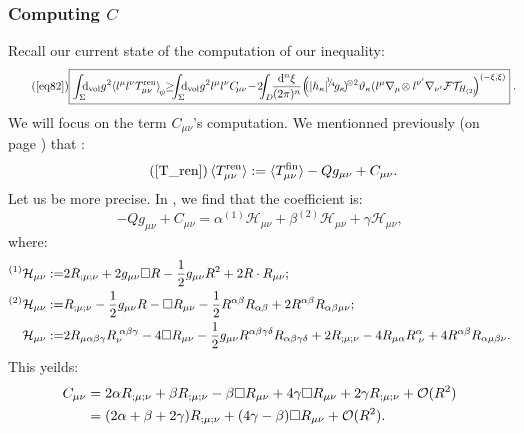\documentclass[a4paper,11pt]{article}
\numberwithin{equation}{section}
\theoremstyle{definition}
\renewcommand{\d}{{\mathrm{d}}}
\begin{document}
\subsubsection{Computing $C$}
Recall our current state of the computation of our inequality:
\begin{equation}\tag{\ref{eq82}}
    \boxed{\int_\Sigma \!\!\!\d_\mathrm{vol} g^2 \!\braket{l^\mu l^\nu T^\mathrm{ren}_{\mu\nu}}_{\!\psi} \!\!\geq\!\!\! \int_\Sigma \!\!\!\d_\mathrm{vol} g^2l^\mu l^\nu C_{\!\mu\nu}\!-\!2\!\!\!\int_D\!\!\frac{\d^n\xi}{(2\pi)^n}\!\left(\!\!(|h_\kappa|^{\!^1\!\!/_{\!4}}\!g_\kappa\!)^{\!\otimes 2}\vartheta_\kappa(l^\mu\nabla_\mu\!\otimes l^{\nu'}\nabla_{\nu'}\mathcal{FT}_{\!\!H_{(2)}}\!\!\right)^{(-\xi,\xi)}}\;.\!\!\!
\end{equation}
We will focus on the term $C_{\mu\nu}$'s computation. We mentionned previously (on page \pageref{T_ren}) that :
\begin{equation}\tag{\ref{T_ren}}
    \braket{T^\mathrm{ren}_{\mu\nu}}:=\braket{T^\mathrm{fin}_{\mu\nu}}-Qg_{\mu\nu} + C_{\mu\nu}.
    \end{equation}
Let us be more precise. In \cite{QFTCurv}, we find that the coefficient is:
\begin{equation}
    -Qg_{\mu\nu}+C_{\mu\nu}=\alpha^{(1)}\mathcal{H}_{\mu\nu}+\beta^{(2)}\mathcal{H}_{\mu\nu}+\gamma\mathcal{H}_{\mu\nu},
\end{equation}
where:
\begin{align}
    ^{(1)}\mathcal{H}_{\mu\nu}:=& 2R_{;\mu;\nu}+ 2g_{\mu\nu}\square R - \frac{1}{2}g_{\mu\nu} R^2 + 2 R\cdot R_{\mu\nu}\notag;\\
    ^{(2)}\mathcal{H}_{\mu\nu}:=& R_{;\mu;\nu} - \frac{1}{2}g_{\mu\nu}R-\square R_{\mu\nu} -\frac{1}{2} R^{\alpha\beta}R_{\alpha\beta}+2R^{\alpha\beta}R_{\alpha\beta\mu\nu};\\
    \mathcal{H}_{\mu\nu}:=& 2R_{\mu\alpha\beta\gamma}R_\nu^{\;\alpha\beta\gamma}-4\square R_{\mu\nu} -\frac{1}{2}g_{\mu\nu}R^{\alpha\beta\gamma\delta}R_{\alpha\beta\gamma\delta} + 2 R_{;\mu;\nu} - 4 R_{\mu\alpha}R^{\alpha}_{\;\nu}+4R^{\alpha\beta}R_{\alpha\mu\beta\nu}\notag.
\end{align}
This yeilds:
\begin{align}
    C_{\mu\nu} &= 2\alpha R_{;\mu;\nu} + \beta R_{;\mu;\nu} - \beta\square R_{\mu\nu} +4\gamma \square R_{\mu\nu} + 2\gamma R_{;\mu;\nu} + \mathcal{O}(R^2)\notag\\
    &= (2\alpha + \beta + 2\gamma) R_{;\mu;\nu} +(4\gamma- \beta)\square R_{\mu\nu} + \mathcal{O}(R^2) \label{C=A+B}.
\end{align}
\end{document}
